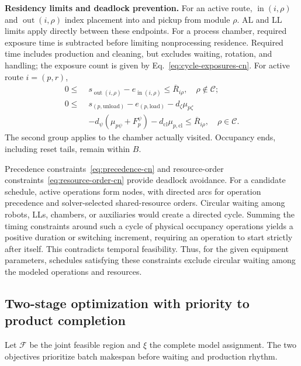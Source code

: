 \documentclass[final,5p,times,twocolumn]{elsarticle}
\begin{document}
\noindent\textbf{Residency limits and deadlock prevention.}
For an active route, $\operatorname{in}(i,\rho)$ and $\operatorname{out}(i,\rho)$ index placement into and pickup from module $\rho$. AL and LL limits apply directly between these endpoints. For a process chamber, required exposure time is subtracted before limiting nonprocessing residence. Required time includes production and cleaning, but excludes waiting, rotation, and handling; the exposure count is given by Eq.~\eqref{eq:cycle-exposures-cn}. For active route $i=(p,r)$,
\begin{equation}
\begin{aligned}
0\le\;&s_{\operatorname{out}(i,\rho)}-e_{\operatorname{in}(i,\rho)}
\le\overline R_{i\rho},\quad \rho\notin\mathcal C;\\
0\le\;&s_{(p,\mathrm{unload})}-e_{(p,\mathrm{load})}
-d_\zeta\mu_{p\zeta}\\
&-d_\psi(\mu_{p\psi}+F_p^\psi)
-d_{\mathrm{cl}}\mu_{p,\mathrm{cl}}\le\overline R_{i\rho},
\quad\rho\in\mathcal C.
\end{aligned}
\label{eq:residence-cn}
\end{equation}
The second group applies to the chamber actually visited. Occupancy ends, including reset tails, remain within $B$.

Precedence constraints~\eqref{eq:precedence-cn} and resource-order constraints~\eqref{eq:resource-order-cn} provide deadlock avoidance. For a candidate schedule, active operations form nodes, with directed arcs for operation precedence and solver-selected shared-resource orders. Circular waiting among robots, LLs, chambers, or auxiliaries would create a directed cycle. Summing the timing constraints around such a cycle of physical occupancy operations yields a positive duration or switching increment, requiring an operation to start strictly after itself. This contradicts temporal feasibility. Thus, for the given equipment parameters, schedules satisfying these constraints exclude circular waiting among the modeled operations and resources.

\subsection{Two-stage optimization with priority to product completion}
\label{sec:model-objective-cn}
Let $\mathcal F$ be the joint feasible region and $\xi$ the complete model assignment. The two objectives prioritize batch makespan before waiting and production rhythm.
\end{document}
